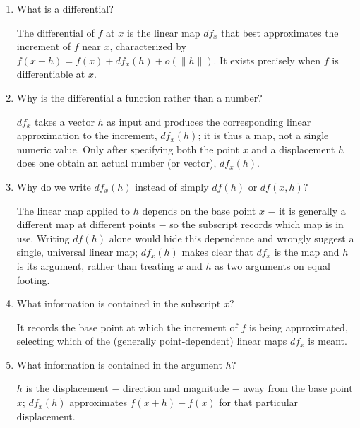 \documentclass{essay}
\begin{document}
\begin{enumerate}[resume, leftmargin=*, itemsep=8pt]

\item What is a differential?
\begin{answer}
The differential of \(f\) at \(x\) is the linear map \(df_x\) that best approximates the increment of \(f\) near \(x\), characterized by \(f(x+h)=f(x)+df_x(h)+o(\|h\|)\). It exists precisely when \(f\) is differentiable at \(x\).
\end{answer}

\item Why is the differential a function rather than a number?
\begin{answer}
\(df_x\) takes a vector \(h\) as input and produces the corresponding linear approximation to the increment, \(df_x(h)\); it is thus a map, not a single numeric value. Only after specifying both the point \(x\) and a displacement \(h\) does one obtain an actual number (or vector), \(df_x(h)\).
\end{answer}

\item Why do we write \(df_x(h)\) instead of simply \(df(h)\) or \(df(x,h)\)?
\begin{answer}
The linear map applied to \(h\) depends on the base point \(x\) \(-\) it is generally a different map at different points \(-\) so the subscript records which map is in use. Writing \(df(h)\) alone would hide this dependence and wrongly suggest a single, universal linear map; \(df_x(h)\) makes clear that \(df_x\) is the map and \(h\) is its argument, rather than treating \(x\) and \(h\) as two arguments on equal footing.
\end{answer}

\item What information is contained in the subscript \(x\)?
\begin{answer}
It records the base point at which the increment of \(f\) is being approximated, selecting which of the (generally point-dependent) linear maps \(df_x\) is meant.
\end{answer}

\item What information is contained in the argument \(h\)?
\begin{answer}
\(h\) is the displacement \(-\) direction and magnitude \(-\) away from the base point \(x\); \(df_x(h)\) approximates \(f(x+h)-f(x)\) for that particular displacement.
\end{answer}


\end{enumerate}
\end{document}
